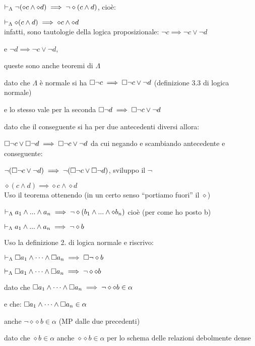 $\vdash_{\Lambda}\neg(\diamond c\wedge\diamond d)\implies\neg\diamond(c\wedge d)$,
cioè:

\textbf{$\vdash_{\Lambda}\diamond(c\wedge d)\implies\diamond c\wedge\diamond d$}\\
infatti, sono tautologie della logica proposizionale: $\neg c\implies\neg c\vee\neg d$

e $\neg d\implies\neg c\vee\neg d$,

queste sono anche teoremi di $\Lambda$

dato che $\Lambda$ è normale si ha \foreignlanguage{english}{$\square\neg c\implies\square\neg c\vee\neg d$}
(definizione 3.3 di logica normale)

e lo stesso vale per la seconda $\square\neg d\implies\square\neg c\vee\neg d$

dato che il conseguente si ha per due antecedenti diversi allora:

%
$\square\neg c\vee\square\neg d\implies\square\neg c\vee\neg d$\foreignlanguage{italian}{
da cui negando e scambiando antecedente e conseguente:}

%
$\neg(\square\neg c\vee\neg d)\implies\neg(\square\neg c\vee\square\neg d)$,
sviluppo il $\neg$

$\diamond(c\wedge d)\implies\diamond c\wedge\diamond d$\\


Uso il teorema ottenendo (in un certo senso ``portiamo fuori'' il
$\diamond$)

%
$\vdash_{\Lambda}a_{1}\wedge...\wedge a_{n}\implies\neg\diamond(b_{1}\wedge...\wedge\diamond b_{n})$\foreignlanguage{italian}{
cioè (per come ho posto b)}

%
$\vdash_{\Lambda}a_{1}\wedge...\wedge a_{n}\implies\neg\diamond b$ 

Uso la definizione 2. di logica normale e riscrivo:

$\vdash_{\Lambda}\square a_{1}\wedge\dots\wedge\square a_{n}\implies\square\neg\diamond b$

$\vdash_{\Lambda}\square a_{1}\wedge\dots\wedge\square a_{n}\implies\neg\diamond\diamond b$

dato che $\square a_{1}\wedge\dots\wedge\square a_{n}\implies\neg\diamond\diamond b\in\alpha$ 

e che: $\square a_{1}\wedge\dots\wedge\square a_{n}\in\alpha$

anche $\neg\diamond\diamond b\in\alpha$ (MP dalle due precedenti)

dato che $\diamond b\in\alpha$ anche $\diamond\diamond b\in\alpha$
per lo schema delle relazioni debolmente dense


